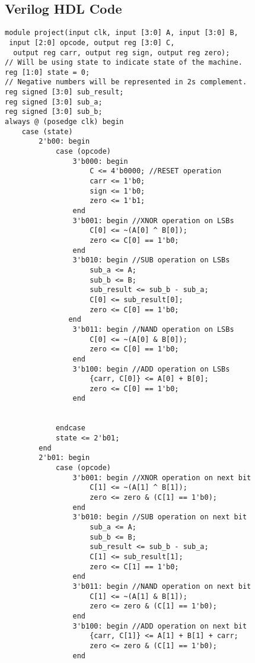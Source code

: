 
\subsection{Verilog HDL Code}\label{subsec:verilog-hdl-code}
\begin{lstlisting}[style=verilogStyle, caption={Verilog code for 4-bit ALU},label={lst: Verilog HDL Code for 4-bit ALU}]
module project(input clk, input [3:0] A, input [3:0] B,
 input [2:0] opcode, output reg [3:0] C,
  output reg carr, output reg sign, output reg zero);
// Will be using state to indicate state of the machine.
reg [1:0] state = 0;
// Negative numbers will be represented in 2s complement.
reg signed [3:0] sub_result;
reg signed [3:0] sub_a;
reg signed [3:0] sub_b;
always @ (posedge clk) begin
    case (state)
        2'b00: begin
            case (opcode)
                3'b000: begin
                    C <= 4'b0000; //RESET operation
                    carr <= 1'b0;
                    sign <= 1'b0;
                    zero <= 1'b1;
                end
                3'b001: begin //XNOR operation on LSBs
                    C[0] <= ~(A[0] ^ B[0]);
                    zero <= C[0] == 1'b0;
                end
                3'b010: begin //SUB operation on LSBs
                    sub_a <= A;
                    sub_b <= B;
                    sub_result <= sub_b - sub_a;
                    C[0] <= sub_result[0];
                    zero <= C[0] == 1'b0;
               end
                3'b011: begin //NAND operation on LSBs
                    C[0] <= ~(A[0] & B[0]);
                    zero <= C[0] == 1'b0;
                end
                3'b100: begin //ADD operation on LSBs
                    {carr, C[0]} <= A[0] + B[0];
                    zero <= C[0] == 1'b0;
                end


            endcase
            state <= 2'b01;
        end
        2'b01: begin
            case (opcode)
                3'b001: begin //XNOR operation on next bit
                    C[1] <= ~(A[1] ^ B[1]);
                    zero <= zero & (C[1] == 1'b0);
                end
                3'b010: begin //SUB operation on next bit
                    sub_a <= A;
                    sub_b <= B;
                    sub_result <= sub_b - sub_a;
                    C[1] <= sub_result[1];
                    zero <= C[1] == 1'b0;
                end
                3'b011: begin //NAND operation on next bit
                    C[1] <= ~(A[1] & B[1]);
                    zero <= zero & (C[1] == 1'b0);
                end
                3'b100: begin //ADD operation on next bit
                    {carr, C[1]} <= A[1] + B[1] + carr;
                    zero <= zero & (C[1] == 1'b0);
                end



\end{lstlisting}
